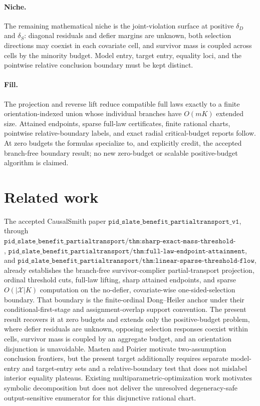 \documentclass{article}
\begin{document}
\paragraph{Niche.} The remaining mathematical niche is the joint-violation surface at positive \(\delta_D\) and \(\delta_S\): diagonal residuals and defier margins are unknown, both selection directions may coexist in each covariate cell, and survivor mass is coupled across cells by the minority budget. Model entry, target entry, equality loci, and the pointwise relative conclusion boundary must be kept distinct.

\paragraph{Fill.} The projection and reverse lift reduce compatible full laws exactly to a finite orientation-indexed union whose individual branches have \(O(mK)\) extended size. Attained endpoints, sparse full-law certificates, finite rational charts, pointwise relative-boundary labels, and exact radial critical-budget reports follow. At zero budgets the formulas specialize to, and explicitly credit, the accepted branch-free boundary result; no new zero-budget or scalable positive-budget algorithm is claimed.

\section{Related work}

The accepted CausalSmith paper \(\texttt{pid\_slate\_benefit\_partialtransport\_v1}\), through \(\texttt{pid\_slate\_benefit\_partialtransport/thm:sharp-exact-mass-threshold-interval}\), \(\texttt{pid\_slate\_benefit\_partialtransport/thm:full-law-endpoint-attainment}\), and \(\texttt{pid\_slate\_benefit\_partialtransport/thm:linear-sparse-threshold-flow}\), already establishes the branch-free survivor-complier partial-transport projection, ordinal threshold cuts, full-law lifting, sharp attained endpoints, and sparse \(O(|\mathcal X|K)\) computation on the no-defier, covariate-wise one-sided-selection boundary. That boundary is the finite-ordinal Dong--Heiler anchor under their conditional-first-stage and assignment-overlap support convention. The present result recovers it at zero budgets and extends only the positive-budget problem, where defier residuals are unknown, opposing selection responses coexist within cells, survivor mass is coupled by an aggregate budget, and an orientation disjunction is unavoidable. Masten and Poirier motivate two-assumption conclusion frontiers, but the present target additionally requires separate model-entry and target-entry sets and a relative-boundary test that does not mislabel interior equality plateaus. Existing multiparametric-optimization work motivates symbolic decomposition but does not deliver the unresolved degeneracy-safe output-sensitive enumerator for this disjunctive rational chart.
\end{document}
